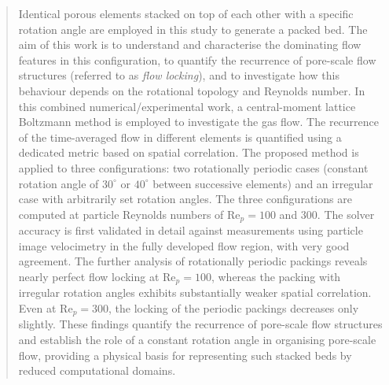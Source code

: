 \author{Katharina Z\"ahringer}

\author{Dominique Th\'evenin}

\date{\today}

\begin{abstract}

Identical porous elements stacked on top of each other with a specific rotation angle are employed in this study to generate a packed bed. The aim of this work is to understand and characterise the dominating flow features in this configuration, to quantify the recurrence of pore-scale flow structures (referred to as \emph{flow locking}), and to investigate how this behaviour depends on the rotational topology and Reynolds number. In this combined numerical/experimental work, a central-moment lattice Boltzmann method is employed to investigate the gas flow. The recurrence of the time-averaged flow in different elements is quantified using a dedicated metric based on spatial correlation. The proposed method is applied to three configurations: two rotationally periodic cases (constant rotation angle of $30^\circ$ or $40^\circ$ between successive elements) and an irregular case with arbitrarily set rotation angles. The three configurations are computed at particle Reynolds numbers of Re$_p = 100$ and $300$. The solver accuracy is first validated in detail against measurements using particle image velocimetry in the fully developed flow region, with very good agreement. The further analysis of rotationally periodic packings reveals nearly perfect flow locking at Re$_p = 100$, whereas the packing with irregular rotation angles exhibits substantially weaker spatial correlation. Even at Re$_p = 300$, the locking of the periodic packings decreases only slightly. These findings quantify the recurrence of pore-scale flow structures and establish the role of a constant rotation angle in organising pore-scale flow, providing a physical basis for representing such stacked beds by reduced computational domains.


\end{abstract}
